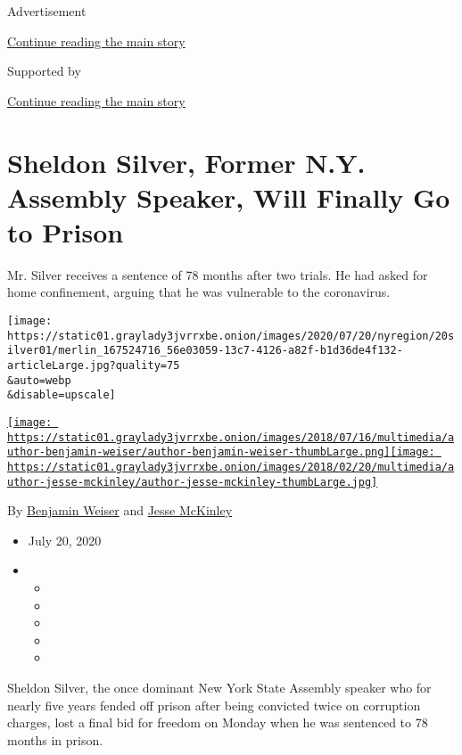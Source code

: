Advertisement

\protect\hyperlink{after-top}{Continue reading the main story}

Supported by

\protect\hyperlink{after-sponsor}{Continue reading the main story}

\hypertarget{sheldon-silver-former-ny-assembly-speaker-will-finally-go-to-prison}{%
\section{Sheldon Silver, Former N.Y. Assembly Speaker, Will Finally Go
to
Prison}\label{sheldon-silver-former-ny-assembly-speaker-will-finally-go-to-prison}}

Mr. Silver receives a sentence of 78 months after two trials. He had
asked for home confinement, arguing that he was vulnerable to the
coronavirus.

\texttt{[image: https://static01.graylady3jvrrxbe.onion/images/2020/07/20/nyregion/20silver01/merlin\_167524716\_56e03059-13c7-4126-a82f-b1d36de4f132-articleLarge.jpg?quality=75\\\&auto=webp\\\&disable=upscale]}

\href{https://www.nytimes3xbfgragh.onion/by/benjamin-weiser}{\texttt{[image: https://static01.graylady3jvrrxbe.onion/images/2018/07/16/multimedia/author-benjamin-weiser/author-benjamin-weiser-thumbLarge.png]}}\href{https://www.nytimes3xbfgragh.onion/by/jesse-mckinley}{\texttt{[image: https://static01.graylady3jvrrxbe.onion/images/2018/02/20/multimedia/author-jesse-mckinley/author-jesse-mckinley-thumbLarge.jpg]}}

By \href{https://www.nytimes3xbfgragh.onion/by/benjamin-weiser}{Benjamin
Weiser} and
\href{https://www.nytimes3xbfgragh.onion/by/jesse-mckinley}{Jesse
McKinley}

\begin{itemize}
\item
  July 20, 2020
\item
  \begin{itemize}
  \item
  \item
  \item
  \item
  \item
  \end{itemize}
\end{itemize}

Sheldon Silver, the once dominant New York State Assembly speaker who
for nearly five years fended off prison after being convicted twice on
corruption charges, lost a final bid for freedom on Monday when he was
sentenced to 78 months in prison.

